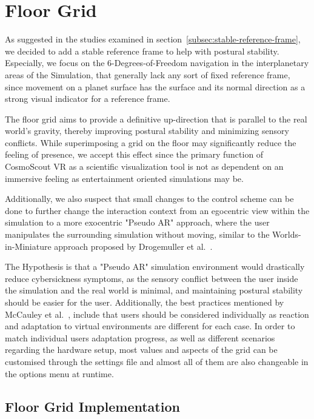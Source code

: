 \section{Floor Grid}\label{sec:floor-grid}

As suggested in the studies examined in section~\ref{subsec:stable-reference-frame}, we decided to add a stable
reference frame to help with postural stability.
Especially, we focus on the 6-Degrees-of-Freedom navigation in the interplanetary areas of the Simulation, that
generally lack any sort of fixed reference frame, since movement on a planet surface has the surface and its normal
direction as a strong visual indicator for a reference frame.

The floor grid aims to provide a definitive up-direction that is parallel to the real world's gravity, thereby
improving postural stability and minimizing sensory conflicts.
While superimposing a grid on the floor may significantly reduce the feeling of presence, we accept this effect since
the primary function of CosmoScout VR as a scientific visualization tool is not as dependent on an immersive feeling
as entertainment oriented simulations may be.

Additionally, we also suspect that small changes to the control scheme can be done to further change the interaction
context from an egocentric view within the simulation to a more exocentric "Pseudo AR" approach, where the user
manipulates the surrounding simulation without moving, similar to the Worlds-in-Miniature approach proposed
by Drogemuller et al.~\cite{Drogemuller2020}.

The Hypothesis is that a "Pseudo AR" simulation environment would drastically reduce cybersickness symptoms, as the
sensory conflict between the user inside the simulation and the real world is minimal, and maintaining postural
stability should be easier for the user.
Additionally, the best practices mentioned by McCauley et al.~\cite{McCauley1992}, include that users should be
considered individually as reaction and adaptation to virtual environments are different for each case.
In order to match individual users adaptation progress, as well as different scenarios regarding the hardware setup,
most values and aspects of the grid can be customised through the settings file and almost all of them are also
changeable in the options menu at runtime.

\subsection{Floor Grid Implementation}\label{subsec:floor-grid-implementation}


